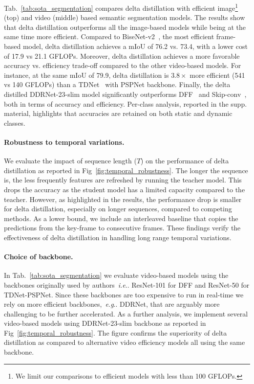 \documentclass[runningheads]{llncs}
\makeatletter
\DeclareRobustCommand\onedot{\futurelet\@let@token\@onedot}
\def\@onedot{\ifx\@let@token.\else.\null\fi\xspace}
\def\eg{\emph{e.g}\onedot} \def\Eg{\emph{E.g}\onedot}
\def\ie{\emph{i.e}\onedot} \def\Ie{\emph{I.e}\onedot}
\makeatother
\begin{document}
Tab.~\ref{tab:sota_segmentation} compares delta distillation with efficient image\footnote{We limit our comparisons to efficient models with less than 100 GFLOPs.} (top) and video (middle) based semantic segmentation models.
The results show that delta distillation outperforms all the image-based models while being at the same time more efficient. 
Compared to BiseNet-v2~\cite{bisenetv2}, the most efficient frame-based model, delta distillation achieves a mIoU of 76.2 vs. 73.4, with a lower cost of 17.9 vs 21.1 GFLOPs. 
Moreover, delta distillation achieves a more favorable accuracy vs. efficiency trade-off compared to the other video-based models.
For instance, at the same mIoU of 79.9, delta distillation is $3.8\times$ more efficient (541 vs 140 GFLOPs) than a TDNet~\cite{hu2020tdnet} with PSPNet backbone. 
Finally, the delta distilled DDRNet-23-slim model significantly outperforms DFF~\cite{zhu17dff} and Skip-conv~\cite{skipconv}, both in terms of accuracy and efficiency.
Per-class analysis, reported in the supp. material, highlights that accuracies are retained on both static and dynamic classes.

\paragraph{Robustness to temporal variations.} We evaluate the impact of sequence length ($T$) on the performance of delta distillation as reported in Fig~\ref{fig:temporal_robustness}. The longer the sequence is, the less frequently features are refreshed by running the teacher model. 
This drops the accuracy as the student model has a limited capacity compared to the teacher. 
However, as highlighted in the results, the performance drop is smaller for delta distillation, especially on longer sequences, compared to competing methods. 
As a lower bound, we include an interleaved baseline that copies the predictions from the key-frame to consecutive frames. 
These findings verify the effectiveness of delta distillation in handling long range temporal variations.

\paragraph{Choice of backbone.} In Tab.~\ref{tab:sota_segmentation} we evaluate video-based models using the backbones originally used by authors~\ie ResNet-101 for DFF and ResNet-50 for TDNet-PSPNet. Since these backbones are too expensive to run in real-time we rely on more efficient backbones,~\eg DDRNet, that are arguably more challenging to be further accelerated. As a further analysis, we implement several video-based models using DDRNet-23-slim backbone as reported in Fig~\ref{fig:temporal_robustness}. The figure confirms the superiority of delta distillation as compared to alternative video efficiency models all using the same backbone.
\end{document}
